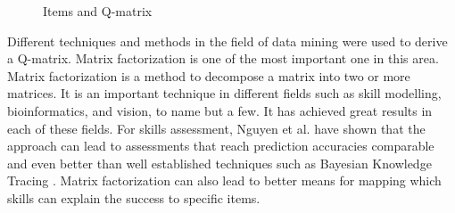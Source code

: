 \begin{footnotesize}
\begin{figure}[ht]
\centering

\quad
\caption{Items and Q-matrix}\label{QItemInt}
\end{figure}
\end{footnotesize}


Different techniques and methods in the field of data mining were used to derive a Q-matrix. Matrix factorization is one of the most important one in this area. Matrix factorization is a method to decompose a matrix into two or more matrices. It is an important technique in different fields such as skill modelling, bioinformatics, and vision, to name but a few. It has achieved great results in each of these fields. For skills assessment, Nguyen et al. \citep{Nguyen2011} have shown that the approach can lead to assessments that reach prediction accuracies comparable and even better than well established techniques such as Bayesian Knowledge Tracing \citep{corbett:umuai:1995}. Matrix factorization can also lead to better means for mapping which skills can explain the success to specific items.

